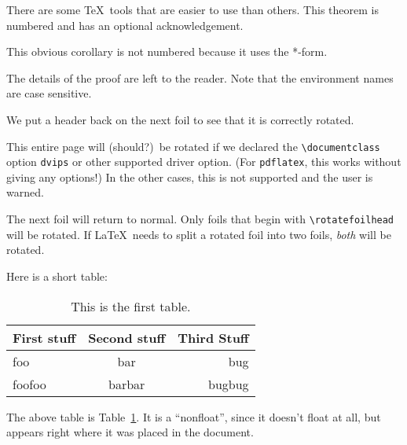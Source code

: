 \documentclass[20pt,dvips]{foils}
\begin{document}

\begin{Theorem}[TUG'92]
There are some \TeX\ tools that are easier to use than others.  This
theorem is numbered and has an optional acknowledgement.
\end{Theorem}

\begin{Corollary*}
This obvious corollary is not numbered because it uses the *-form.
\end{Corollary*}

\begin{Proof}
The details of the proof are left to the reader.  Note that the
environment names are case sensitive.
\end{Proof}

We put a header back on the next foil to see that it is correctly
rotated.


This entire page will (should?)~be rotated if we declared the
\verb|\documentclass| option \texttt{dvips} or other supported driver
option.  (For \texttt{pdflatex}, this works without giving any
options!)  In the other cases, this is not supported and the user is
warned.

The next foil will return to normal.  Only foils that begin with
\verb|\rotatefoilhead| will be rotated.  If \LaTeX\ needs to split a
rotated foil into two foils, \emph{both} will be rotated.

\leftheader{}

Here is a short table:

\begin{table}
\begin{center}
\begin{tabular}{|l|c|r|} \hline
First stuff & Second stuff & Third Stuff \\ \hline\hline
foo & bar & bug \\ \hline
foofoo & barbar & bugbug \\ \hline
\end{tabular}
\caption{\label{tab:one}This is the first table.}
\end{center}
\end{table}

The above table is Table~\ref{tab:one}.  It is a ``nonfloat'', since
it doesn't float at all, but appears right where it was placed in the
document.
\end{document}
